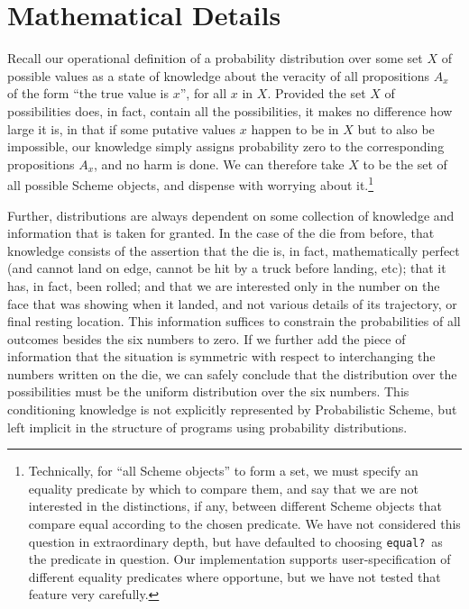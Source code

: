 \documentclass[12pt]{article}
\newcommand{\code}[1]{\texttt{#1}}
\begin{document}
\section{Mathematical Details}
\label{math-details}

Recall our operational definition of a probability distribution over some set
$X$ of possible values as a state of knowledge about the veracity of
all propositions $A_x$ of the form ``the true value is $x$'', for all
$x$ in $X$.
Provided the set $X$ of possibilities does, in fact, contain all the
possibilities, it makes no difference how large it is, in that if some
putative values $x$ happen to be in $X$ but to also be impossible, our
knowledge simply assigns probability zero to the corresponding
propositions $A_x$, and no harm is done.  We can therefore take $X$ to
be the set of all possible Scheme objects, and dispense with worrying
about it.\footnote{Technically, for ``all Scheme objects'' to form a
set, we must specify an equality predicate by which to compare them,
and say that we are not interested in the distinctions, if any,
between different Scheme objects that compare equal according to the
chosen predicate.  We have not considered this question in
extraordinary depth, but have defaulted to choosing \code{equal?}\ as
the predicate in question.  Our implementation supports
user-specification of different equality predicates where opportune,
but we have not tested that feature very carefully.}

Further, distributions are always dependent on some collection of
knowledge and information that is taken for granted.  In the case of
the die from before, that knowledge consists of the assertion that the
die is, in fact, mathematically perfect (and cannot land on edge,
cannot be hit by a truck before landing, etc); that it has, in fact,
been rolled; and that we are interested only in the number on the face
that was showing when it landed, and not various details of its
trajectory, or final resting location.  This information suffices to
constrain the probabilities of all outcomes besides the six numbers to
zero.  If we further add the piece of information that the situation
is symmetric with respect to interchanging the numbers written on the
die, we can safely conclude that the distribution over the
possibilities must be the uniform distribution over the six numbers.
This conditioning knowledge is not explicitly represented by
Probabilistic Scheme, but left implicit in the structure of programs
using probability distributions.
\end{document}
